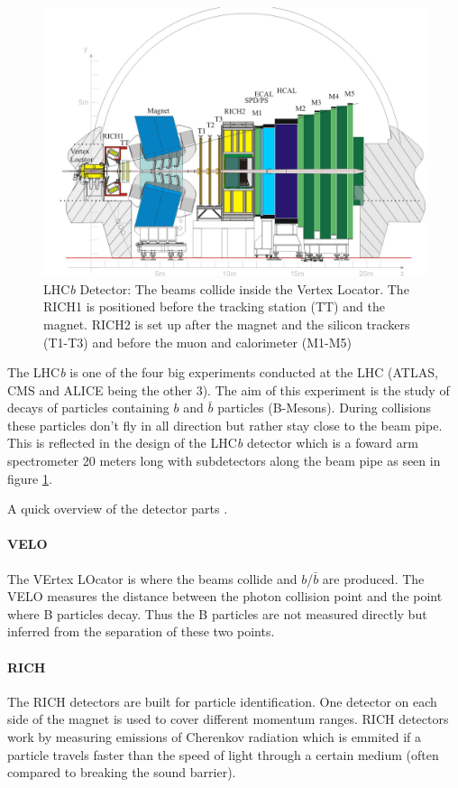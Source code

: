 \documentclass[11pt,twoside]{scrreprt}
\begin{document}
\begin{figure}[tb]
  \centering
  \includegraphics[width=\textwidth]{pics/lhcb_detector}
  \caption{LHC\textit{b} Detector: The beams collide inside the Vertex Locator. The RICH1 is positioned before the tracking station (TT) and
  the magnet. RICH2 is set up after the magnet and the silicon trackers (T1-T3) and before the muon and calorimeter (M1-M5)}
  \label{fig:lhcb}
\end{figure}

The LHC\textit{b} is one of the four big experiments conducted at the LHC (ATLAS, CMS and ALICE being the other 3). The aim of this experiment is the study of decays of particles containing $b$ and $\bar{b}$ particles (B-Mesons). During collisions these particles don't fly in all direction but rather stay close to the beam pipe. This is reflected in the design of the LHC\textit{b} detector which is a foward arm spectrometer 20 meters long with subdetectors along the beam pipe as seen in figure \ref{fig:lhcb}.

A quick overview of the detector parts \parencite{lhcbweb}.

\paragraph{VELO} The VErtex LOcator is where the beams collide and $b$/$\bar{b}$ are produced. The VELO measures the distance between the photon collision point and the point where B particles decay. Thus the B particles are not measured directly but inferred from the separation of these two points.

\paragraph{RICH} The RICH detectors are built for particle identification. One detector on each side of the magnet is used to cover different momentum ranges. RICH detectors work by measuring emissions of Cherenkov radiation which is emmited if a particle travels faster than the speed of light through a certain medium (often compared to breaking the sound barrier).
\end{document}
